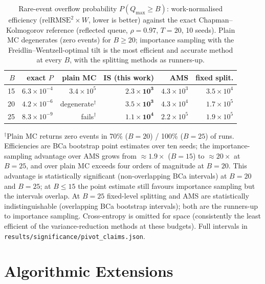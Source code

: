 \documentclass{ieeeaccess}
\begin{document}
\begin{table}[!t]
\caption{Rare-event overflow probability $P(Q_{\max}\geq B)$: work-normalised efficiency
($\mathrm{relRMSE}^2\times W$, lower is better) against the exact Chapman--Kolmogorov reference
(reflected queue, $\rho{=}0.97$, $T{=}20$, 10 seeds). Plain MC degenerates (zero events) for
$B\geq20$; importance sampling with the Freidlin--Wentzell-optimal tilt is the most efficient and
accurate method at every $B$, with the splitting methods as runners-up.}
\label{tab:rare_event}
\centering\footnotesize
\setlength{\tabcolsep}{3.5pt}
\begin{tabular}{@{}r r r r r r@{}}
\toprule
$B$ & exact $P$ & plain MC & \textbf{IS (this work)} & AMS & fixed split. \\
\midrule
15 & $6.3\times10^{-4}$ & $3.4\times10^{5}$ & $\mathbf{2.3\times10^{3}}$ & $4.3\times10^{3}$ & $3.5\times10^{4}$ \\
20 & $4.2\times10^{-6}$ & degenerate$^\dagger$ & $\mathbf{3.5\times10^{3}}$ & $4.3\times10^{4}$ & $1.7\times10^{5}$ \\
25 & $8.3\times10^{-9}$ & fails$^\dagger$ & $\mathbf{1.1\times10^{4}}$ & $2.2\times10^{5}$ & $1.9\times10^{5}$ \\
\bottomrule
\end{tabular}
\vspace{2pt}
\footnotesize $^\dagger$Plain MC returns zero events in 70\% ($B{=}20$) / 100\% ($B{=}25$) of
runs. Efficiencies are BCa bootstrap point estimates over ten seeds; the importance-sampling
advantage over AMS grows from ${\approx}1.9\times$ ($B{=}15$) to ${\approx}20\times$ at $B{=}25$,
and over plain MC exceeds four orders of magnitude at $B{=}20$. This advantage is statistically
significant (non-overlapping BCa intervals) at $B{=}20$ and $B{=}25$; at $B{\le}15$ the point
estimate still favours importance sampling but the intervals overlap. At $B{=}25$ fixed-level splitting
and AMS are statistically indistinguishable (overlapping BCa bootstrap intervals); both are the
runners-up to importance sampling. Cross-entropy is omitted for space (consistently the least
efficient of the variance-reduction methods at these budgets). Full intervals in
\texttt{results/significance/pivot\_claims.json}.
\end{table}

\section{Algorithmic Extensions}
\end{document}
